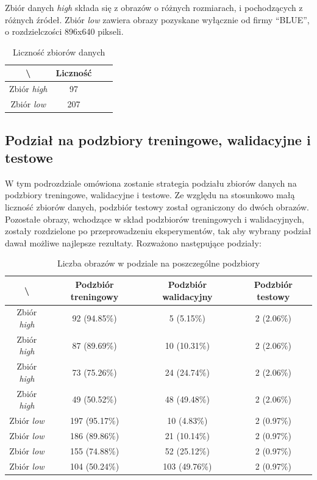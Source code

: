Zbiór danych \textit{high} składa się z obrazów o różnych rozmiarach, i pochodzących z różnych źródeł.
Zbiór \textit{low} zawiera obrazy pozyskane wyłącznie od firmy ``BLUE'', o rozdzielczości 896x640 pikseli.

\begin{table}[!h]
	\centering
	\caption{Liczność zbiorów danych}
	\vspace{6pt}
	{\footnotesize
		\begin{tabular}{|c|c|c|c|}
			\hline \textbackslash & Liczność \\
      \hline Zbiór \textit{high} & 97 \\
      \hline Zbiór \textit{low} & 207 \\
      \hline
		\end{tabular}
	}
	\vspace{0pt}
\end{table}

\newpage
\subsection{Podział na podzbiory treningowe, walidacyjne i testowe}
W tym podrozdziale omówiona zostanie strategia podziału zbiorów danych na podzbiory treningowe, walidacyjne i testowe.
Ze względu na stosunkowo małą liczność zbiorów danych, podzbiór testowy został ograniczony do dwóch obrazów.
Pozostałe obrazy, wchodzące w skład podzbiorów treningowych i walidacyjnych, zostały rozdzielone po przeprowadzeniu eksperymentów, tak aby wybrany podział dawał możliwe najlepsze rezultaty.
Rozważono następujące podziały:

\begin{table}[!h]
	\centering
	\caption{Liczba obrazów w podziale na poszczególne podzbiory}
	\vspace{6pt}
	{\footnotesize
		\begin{tabular}{|c|c|c|c|}
			\hline \textbackslash & Podzbiór treningowy & Podzbiór walidacyjny & Podzbiór testowy \\
      \hline Zbiór \textit{high} & 92 (94.85\%) & 5 (5.15\%) & 2 (2.06\%) \\
      \hline Zbiór \textit{high} & 87 (89.69\%) & 10 (10.31\%) & 2 (2.06\%) \\
      \hline Zbiór \textit{high} & 73 (75.26\%) & 24 (24.74\%) & 2 (2.06\%) \\
      \hline Zbiór \textit{high} & 49 (50.52\%) & 48 (49.48\%) & 2 (2.06\%) \\
      \hline Zbiór \textit{low} & 197 (95.17\%) & 10 (4.83\%) & 2 (0.97\%) \\
      \hline Zbiór \textit{low} & 186 (89.86\%) & 21 (10.14\%) & 2 (0.97\%) \\
      \hline Zbiór \textit{low} & 155 (74.88\%) & 52 (25.12\%) & 2 (0.97\%) \\
      \hline Zbiór \textit{low} & 104 (50.24\%) & 103 (49.76\%) & 2 (0.97\%) \\
      \hline
		\end{tabular}
	}
	\vspace{0pt}
\end{table}



